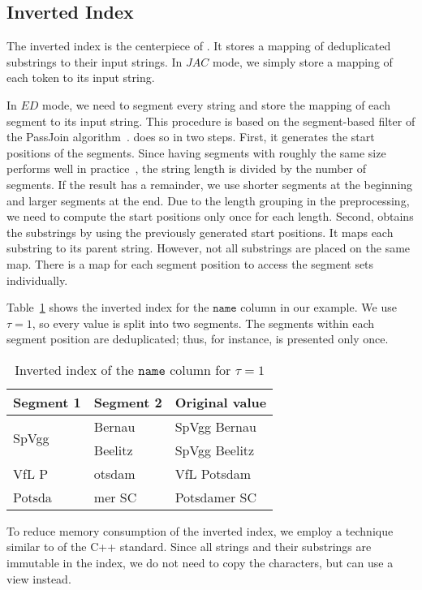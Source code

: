 \subsection{Inverted Index}
The inverted index is the centerpiece of \sawfish.
It stores a mapping of deduplicated substrings to their input strings.
In $JAC$ mode, we simply store a mapping of each token to its input string.

In $ED$ mode, we need to segment every string and store the mapping of each segment to its input string.
This procedure is based on the segment-based filter of the PassJoin algorithm~\cite{PassJoin}.
\sawfish does so in two steps.
First, it generates the start positions of the segments.
Since having segments with roughly the same size performs well in practice~\cite{PassJoin}, the string length is divided by the number of segments.
If the result has a remainder, we use shorter segments at the beginning and larger segments at the end.
Due to the length grouping in the preprocessing, we need to compute the start positions only once for each length.
Second, \sawfish obtains the substrings by using the previously generated start positions.
It maps each substring to its parent string.
However, not all substrings are placed on the same map.
There is a map for each segment position to access the segment sets individually.

Table~\ref{fig:impl:index} shows the inverted index for the $\mathtt{name}$ column in our example.
We use $\tau = 1$, so every value is split into two segments.
The segments within each segment position are deduplicated; thus, for instance,  is presented only once.

\begin{table}[ht]
\centering
\caption{Inverted index of the $\mathtt{name}$ column for $\tau = 1$}
\label{fig:impl:index}
\begin{tabular}{@{}lll@{}}
    \toprule
        Segment 1 & Segment 2 & Original value  \\
        \midrule
        \multirow{2}{*}{SpVgg} & Bernau & SpVgg Bernau\\
        & Beelitz & SpVgg Beelitz\\ \midrule
        VfL P & otsdam & VfL Potsdam \\ \midrule
        Potsda & mer SC & Potsdamer SC\\
\bottomrule
\end{tabular}
\end{table}

To reduce memory consumption of the inverted index, we employ a technique similar to  of the C++ standard.
Since all strings and their substrings are immutable in the index, we do not need to copy the characters, but can use a view instead.


